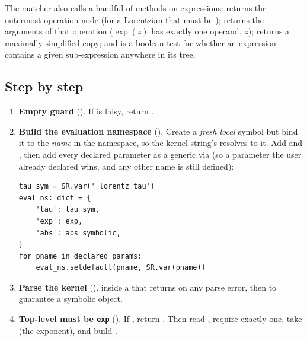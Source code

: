 The matcher also calls a handful of methods on  expressions:
 returns the outermost operation node (for a Lorentzian that
must be );  returns the arguments of that operation
($\exp(z)$ has exactly one operand, $z$);  returns a
maximally-simplified copy; and  is a boolean test for whether an
expression contains a given sub-expression anywhere in its tree.

\subsection{Step by step}

\begin{enumerate}
  \item \textbf{Empty guard} (). If
         is falsy, return .

  \item \textbf{Build the evaluation namespace}
        (). Create a
        \emph{fresh local} symbol  but
        bind it to the \emph{name}  in the namespace, so the kernel
        string's  resolves to it. Add  and , then add every declared parameter as a generic
         via  (so a parameter the user
        already declared wins, and any other name is still defined):
\begin{lstlisting}
tau_sym = SR.var('_lorentz_tau')
eval_ns: dict = {
    'tau': tau_sym,
    'exp': exp,
    'abs': abs_symbolic,
}
for pname in declared_params:
    eval_ns.setdefault(pname, SR.var(pname))
\end{lstlisting}

  \item \textbf{Parse the kernel}
        ().
         inside a 
        that returns  on any parse error, then  to
        guarantee a symbolic object.

  \item \textbf{Top-level must be \texttt{exp}}
        (). If
        , return . Then read
        , require exactly one, take
         (the exponent), and build
        .


\end{enumerate}

